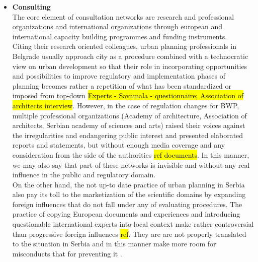 \documentclass[11pt]{report}
\begin{document}
\begin{itemize}
\item \textbf{Consulting}
\\
The core element of consultation networks are research and professional organizations and international organizations through european and international capacity building programmes and funding instruments.
\\
Citing their research oriented colleagues, urban planning professionals in Belgrade usually approach city as a procedure combined with a technocratic view on urban development so that their role in incorporating opportunities and possibilities to improve regulatory and implementation phases of planning becomes rather a repetition of what has been standardized or imposed from top-down \hl{Experts - Savamala - questionnaire; Association of architects interview}. However, in the case of regulation changes for BWP, multiple professional organizations (Academy of architecture, Association of architects, Serbian academy of sciences and arts) raised their voices against the irregularities and endangering public interest and presented elaborated reports and statements, but without enough media coverage and any consideration from the side of the authorities \hl{ref documents}. In this manner, we may also say that part of these networks is invisible and without any real influence in the public and regulatory domain.
\\
On the other hand, the not up-to date practice of urban planning in Serbia also pay its toll to the marketization of the scientific domains by expanding foreign influences that do not fall under any of evaluating procedures. The practice of copying European documents and experiences and introducing questionable international experts into local context make rather controversial than progressive foreign influences \hl{ref}. They are are not properly translated to the situation in Serbia and in this manner make more room for misconducts that for preventing it \cite{Vujosevic 2012}.


\end{itemize}
\end{document}
